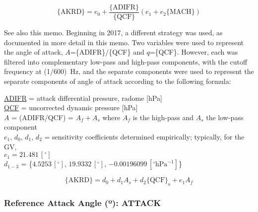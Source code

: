 \documentclass[
  english,
]{book}
\begin{document}
\begin{equation}
\mathrm{\{AKRD\}}=e_{0}+\frac{\{\mathrm{ADIFR}\}}{\{\mathrm{QCF}\}}\left(e_{1}+e{}_{2}\mathrm{\{MACH\}}\right)
\label{eq:AKRD}
\end{equation}

See also this memo.
Beginning in 2017, a different strategy was used, as documented in more detail in this memo. Two variables were used to represent the angle of attack, \(A\)=\{ADIFR\}/\{QCF\} and \(q\)=\{QCF\}. However, each was filtered into complementary low-pass and high-pass components, with the cutoff frequency at (1/600)~Hz, and the separate components were used to represent the separate components of angle of attack according to the following formula:

\protect\hyperlink{adifr}{ADIFR} = attack differential pressure, radome {[}hPa{]}\\
\protect\hyperlink{qcx}{QCF} = uncorrected dynamic pressure {[}hPa{]}\\
\(A\) = (ADIFR/QCF) = \(A_{f}+A_{s}\) where \(A_{f}\) is the high-pass
and \(A_{s}\) the low-pass component\\
\(e_{1},\,d_{0},\,d{}_{1},\,d_{2}\) = sensitivity
coefficients determined empirically; typically, for the GV,\\
\hspace*{0.333em}\hspace*{0.333em}\hspace*{0.333em}\hspace*{0.333em}\hspace*{0.333em}\(e_{1}=21.481\,[^{\circ}]\)\\
\hspace*{0.333em}\hspace*{0.333em}\hspace*{0.333em}\hspace*{0.333em}\hspace*{0.333em}\(d_{1-3}\) = \{\(4.5253\,[^{\circ}]\), \(19.9332\,[^{\circ}]\), \(-0.00196099\,[^{\circ}\mathrm{hPa}^{-1}]\)\}

\begin{equation}
\mathrm{\{AKRD\}}=d_{0}+d_{1}A_{s}+d_{2}\mathrm{\{QCF\}_{s}+}e_{1}A_{f}
\label{eq:newAKRD}
\end{equation}

\hypertarget{attack}{%
\subsubsection*{\texorpdfstring{Reference Attack Angle ({º}): ATTACK}{Reference Attack Angle (º): ATTACK}}\label{attack}}
\end{document}
